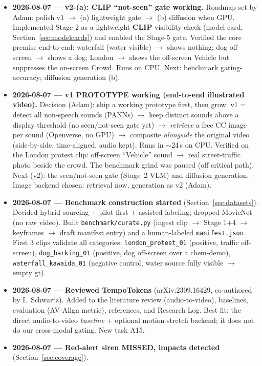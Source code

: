 \documentclass[11pt,a4paper]{article}
\begin{document}
\begin{itemize}
  \item \textbf{2026-08-07 --- v2-(a): CLIP ``not-seen'' gate working.} Roadmap set by Adam:
    polish v1 $\to$ (a) lightweight gate $\to$ (b) diffusion when GPU. Implemented Stage 2 as a
    lightweight \textbf{CLIP} visibility check (model card, Section~\ref{sec:modelcards}) and enabled
    the Stage-5 gate. Verified the core premise end-to-end: waterfall (water visible) $\to$ shows
    nothing; dog off-screen $\to$ shows a dog; London $\to$ shows the off-screen Vehicle but suppresses
    the on-screen Crowd. Runs on CPU. Next: benchmark gating-accuracy; diffusion generation (b).
  \item \textbf{2026-08-07 --- v1 PROTOTYPE working (end-to-end illustrated video).} Decision (Adam):
    ship a working prototype first, then grow. v1 = detect all non-speech sounds (PANNs) $\to$ keep
    distinct sounds above a display threshold (no seen/not-seen gate yet) $\to$ \emph{retrieve} a free
    CC image per sound (Openverse, no GPU) $\to$ composite \emph{alongside} the original video
    (side-by-side, time-aligned, audio kept). Runs in $\sim$24\,s on CPU. Verified on the London
    protest clip: off-screen ``Vehicle'' sound $\to$ real street-traffic photo beside the crowd. The
    benchmark grind was paused (off critical path). Next (v2): the seen/not-seen gate (Stage~2 VLM)
    and diffusion generation. Image backend chosen: retrieval now, generation as v2 (Adam).
  \item \textbf{2026-08-07 --- Benchmark construction started} (Section~\ref{sec:datasets}). Decided
    hybrid sourcing + pilot-first + assisted labeling; dropped MovieNet (no raw video). Built
    \texttt{benchmark/curate.py} (ingest clip $\to$ Stage 1+4 $\to$ keyframes $\to$ draft manifest
    entry) and a human-labeled \texttt{manifest.json}. First 3 clips validate all categories:
    \texttt{london\_protest\_01} (positive, traffic off-screen), \texttt{dog\_barking\_01} (positive,
    dog off-screen over a chem-demo), \texttt{waterfall\_kawaida\_01} (negative control, water source
    fully visible $\to$ empty gt).
  \item \textbf{2026-08-07 --- Reviewed TempoTokens} (arXiv:2309.16429, co-authored by I.\ Schwartz).
    Added to the literature review (audio-to-video), baselines, evaluation (AV-Align metric),
    references, and Research Log. Best fit: the direct audio-to-video \emph{baseline} + optional
    motion-stretch backend; it does not do our cross-modal gating. New task A15.
  \item \textbf{2026-08-07 --- Red-alert siren MISSED, impacts detected} (Section~\ref{sec:coverage}).

\end{itemize}
\end{document}
